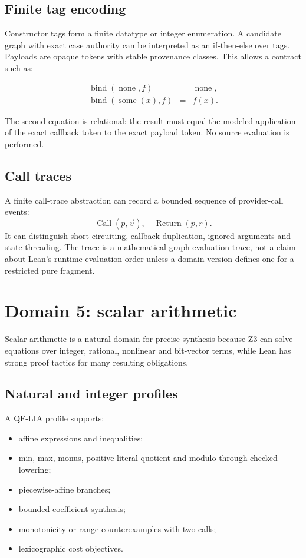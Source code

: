 \documentclass[11pt,oneside]{report}
\begin{document}
\subsection{Finite tag encoding}

Constructor tags form a finite datatype or integer enumeration. A candidate graph with exact case authority can be interpreted as an if-then-else over tags. Payloads are opaque tokens with stable provenance classes. This allows a contract such as:

\[
\begin{array}{rcl}
\operatorname{bind}(\operatorname{none},f) &=& \operatorname{none},\\
\operatorname{bind}(\operatorname{some}(x),f) &=& f(x).
\end{array}
\]

The second equation is relational: the result must equal the modeled application of the exact callback token to the exact payload token. No source evaluation is performed.

\subsection{Call traces}

A finite call-trace abstraction can record a bounded sequence of provider-call events:
\[
  \operatorname{Call}(p,\vec{v}),\quad \operatorname{Return}(p,r).
\]
It can distinguish short-circuiting, callback duplication, ignored arguments and state-threading. The trace is a mathematical graph-evaluation trace, not a claim about Lean's runtime evaluation order unless a domain version defines one for a restricted pure fragment.

\section{Domain 5: scalar arithmetic}
\label{sec:domain-scalar}

Scalar arithmetic is a natural domain for precise synthesis because Z3 can solve equations over integer, rational, nonlinear and bit-vector terms, while Lean has strong proof tactics for many resulting obligations.

\subsection{Natural and integer profiles}

A QF-LIA profile supports:

\begin{itemize}[leftmargin=2em]
\item affine expressions and inequalities;
\item min, max, monus, positive-literal quotient and modulo through checked lowering;
\item piecewise-affine branches;
\item bounded coefficient synthesis;
\item monotonicity or range counterexamples with two calls;
\item lexicographic cost objectives.
\end{itemize}
\end{document}
